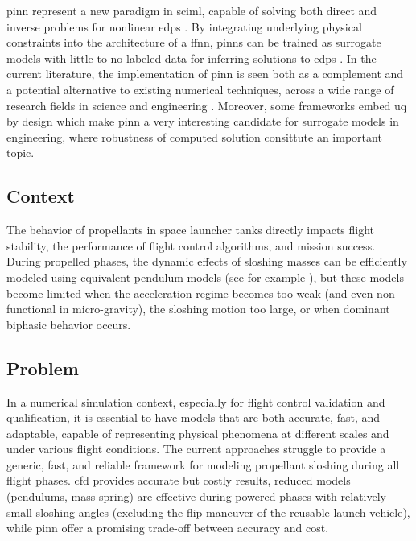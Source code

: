 \documentclass[12pt]{article}
\begin{document}
	\gls{pinn} represent a new paradigm in \gls{sciml}, capable of solving both direct and inverse problems for nonlinear \gls{edps} \cite{raissiPhysicsinformedNeuralNetworks2019}. By integrating underlying physical constraints into the architecture of a \gls{ffnn}, \gls{pinn}s can be trained as surrogate models with little to no labeled data for inferring solutions to \gls{edps} \cite{cuomoScientificMachineLearning2022}.
	In the current literature, the implementation of \gls{pinn} is seen both as a complement and a potential alternative to existing numerical techniques, across a wide range of research fields in science and engineering \cite{maoPhysicsinformedNeuralNetworks2020, buosoPersonalisingLeftventricularBiophysical2021, caiPhysicsInformedNeuralNetworks2021}.
	Moreover, some frameworks embed \gls{uq} by design \cite{yangBPINNsBayesianPhysicsInformed2021,zhangQuantifyingTotalUncertainty2018} which make \gls{pinn} a very interesting candidate for surrogate models in engineering, where robustness of computed solution consittute an important topic.
	
	\subsection*{Context}
	
	The behavior of propellants in space launcher tanks directly impacts flight stability, the performance of flight control algorithms, and mission success. During propelled phases, the dynamic effects of sloshing masses can be efficiently modeled using equivalent pendulum models (see for example \cite{ibrahimLiquidSloshingDynamics2005a}), but these models become limited when the acceleration regime becomes too weak (and even non-functional in micro-gravity), the sloshing motion too large, or when dominant biphasic behavior occurs.
	
	\subsection*{Problem}
	
	In a numerical simulation context, especially for flight control validation and qualification, it is essential to have models that are both accurate, fast, and adaptable, capable of representing physical phenomena at different scales and under various flight conditions.
	The current approaches struggle to provide a generic, fast, and reliable framework for modeling propellant sloshing during all flight phases. \acrshort{cfd} provides accurate but costly results, reduced models (pendulums, mass-spring) are effective during powered phases with relatively small sloshing angles (excluding the flip maneuver of the reusable launch vehicle), while \gls{pinn} offer a promising trade-off between accuracy and cost.
	
\end{document}
